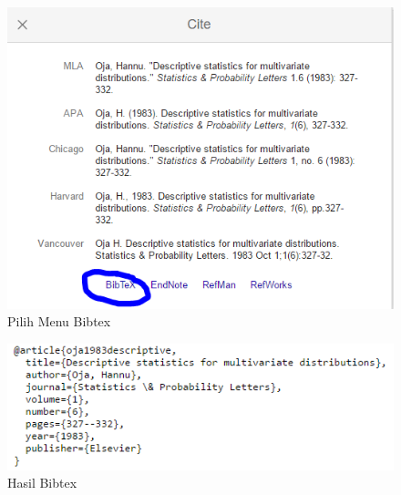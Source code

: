 \begin{figure}[ht]
        \centerline{\includegraphics[width=1\textwidth]{figures/hasiltandakutip}}
        \caption{Pilih Menu Bibtex}
		\label{hasiltandakutip}
\end{figure}

\begin{figure}[ht]
        \centerline{\includegraphics[width=1\textwidth]{figures/hasilbibtex}}
        \caption{Hasil Bibtex}
		\label{hasilbibtex}
\end{figure}

